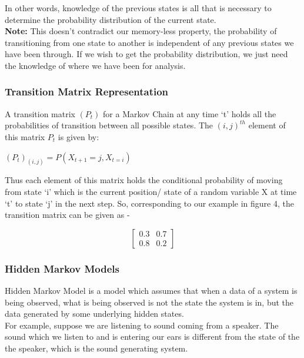 \documentclass[10pt,twocolumn,letterpaper]{article}
\begin{document}
In other words, knowledge of the previous states is all that is necessary to determine the probability distribution of the current state.  \\

\textbf{Note:} This doesn’t contradict our memory-less property, the probability of transitioning from one state to another is independent of any previous states we have been through. If we wish to get the probability distribution, we just need the knowledge of where we have been for analysis.


\subsubsection{Transition Matrix Representation}
A transition matrix $(P_t)$ for a Markov Chain at any time ‘t’ holds all the probabilities of transition between all possible states. The $(i,j)^{th}$ element of this matrix $P_t$ is given by: 
\begin{center}
    $(P_t)_{(i,j)} = P(X_{t+1} = j, X_{t = i})$ 
\end{center}

Thus each element of this matrix holds the conditional probability of moving from state ‘i’ which is the current position/ state of a random variable X at time ‘t’ to state ‘j’ in the next step. So, corresponding to our example in figure 4, the transition matrix can be given as -  

$$\begin{bmatrix}
0.3 & 0.7\\
0.8 & 0.2
\end{bmatrix}$$


\subsubsection{Hidden Markov Models}

Hidden Markov Model is a model which assumes that when a data of a system is being observed, what is being observed is not the state the system is in, but the data generated by some underlying hidden states. \\

For example, suppose we are listening to sound coming from a speaker. The sound which we listen to and is entering our ears is different from the state of the the speaker, which is the sound generating system. \\
\end{document}
